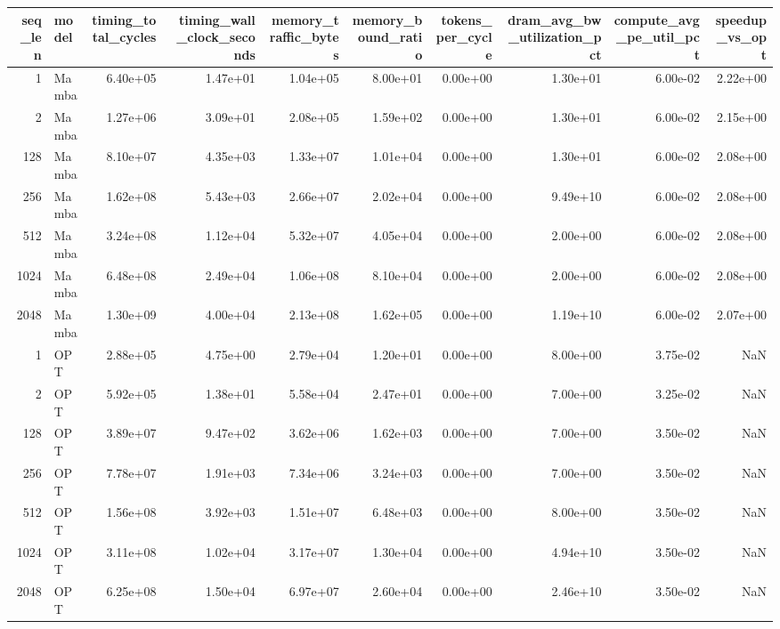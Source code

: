 \begin{tabular}{rlrrrrrrrr}
\toprule
seq_len & model & timing_total_cycles & timing_wall_clock_seconds & memory_traffic_bytes & memory_bound_ratio & tokens_per_cycle & dram_avg_bw_utilization_pct & compute_avg_pe_util_pct & speedup_vs_opt \\
\midrule
1 & Mamba & 6.40e+05 & 1.47e+01 & 1.04e+05 & 8.00e+01 & 0.00e+00 & 1.30e+01 & 6.00e-02 & 2.22e+00 \\
2 & Mamba & 1.27e+06 & 3.09e+01 & 2.08e+05 & 1.59e+02 & 0.00e+00 & 1.30e+01 & 6.00e-02 & 2.15e+00 \\
128 & Mamba & 8.10e+07 & 4.35e+03 & 1.33e+07 & 1.01e+04 & 0.00e+00 & 1.30e+01 & 6.00e-02 & 2.08e+00 \\
256 & Mamba & 1.62e+08 & 5.43e+03 & 2.66e+07 & 2.02e+04 & 0.00e+00 & 9.49e+10 & 6.00e-02 & 2.08e+00 \\
512 & Mamba & 3.24e+08 & 1.12e+04 & 5.32e+07 & 4.05e+04 & 0.00e+00 & 2.00e+00 & 6.00e-02 & 2.08e+00 \\
1024 & Mamba & 6.48e+08 & 2.49e+04 & 1.06e+08 & 8.10e+04 & 0.00e+00 & 2.00e+00 & 6.00e-02 & 2.08e+00 \\
2048 & Mamba & 1.30e+09 & 4.00e+04 & 2.13e+08 & 1.62e+05 & 0.00e+00 & 1.19e+10 & 6.00e-02 & 2.07e+00 \\
1 & OPT & 2.88e+05 & 4.75e+00 & 2.79e+04 & 1.20e+01 & 0.00e+00 & 8.00e+00 & 3.75e-02 & NaN \\
2 & OPT & 5.92e+05 & 1.38e+01 & 5.58e+04 & 2.47e+01 & 0.00e+00 & 7.00e+00 & 3.25e-02 & NaN \\
128 & OPT & 3.89e+07 & 9.47e+02 & 3.62e+06 & 1.62e+03 & 0.00e+00 & 7.00e+00 & 3.50e-02 & NaN \\
256 & OPT & 7.78e+07 & 1.91e+03 & 7.34e+06 & 3.24e+03 & 0.00e+00 & 7.00e+00 & 3.50e-02 & NaN \\
512 & OPT & 1.56e+08 & 3.92e+03 & 1.51e+07 & 6.48e+03 & 0.00e+00 & 8.00e+00 & 3.50e-02 & NaN \\
1024 & OPT & 3.11e+08 & 1.02e+04 & 3.17e+07 & 1.30e+04 & 0.00e+00 & 4.94e+10 & 3.50e-02 & NaN \\
2048 & OPT & 6.25e+08 & 1.50e+04 & 6.97e+07 & 2.60e+04 & 0.00e+00 & 2.46e+10 & 3.50e-02 & NaN \\
\bottomrule
\end{tabular}

